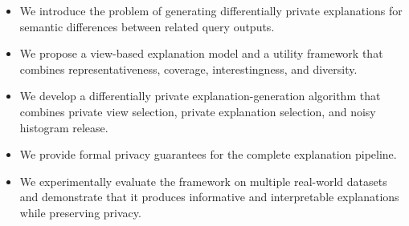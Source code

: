 \begin{itemize}

\item We introduce the problem of generating differentially private
explanations for semantic differences between related query outputs.

\item We propose a view-based explanation model and a utility
framework that combines representativeness, coverage,
interestingness, and diversity.

\item We develop a differentially private explanation-generation
algorithm that combines private view selection, private explanation
selection, and noisy histogram release.

\item We provide formal privacy guarantees for the complete
explanation pipeline.

\item We experimentally evaluate the framework on multiple
real-world datasets and demonstrate that it produces informative
and interpretable explanations while preserving privacy.

\end{itemize}
